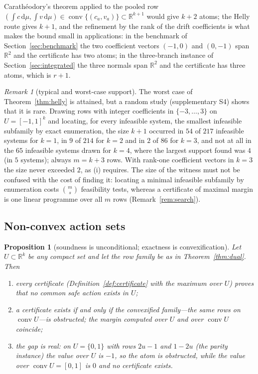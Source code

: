 \documentclass[11pt,a4paper]{article}
\theoremstyle{plain}
\newtheorem{proposition}[theorem]{Proposition}
\theoremstyle{definition}
\theoremstyle{remark}
\newtheorem{remark}[theorem]{Remark}
\newcommand{\R}{\mathbb{R}}
\newcommand{\conv}{\operatorname{conv}}
\newcommand{\dd}{\,\mathrm{d}}
\begin{document}
Carath\'eodory's theorem applied to the pooled row $(\int c\dd\mu,\int v\dd\mu)\in\conv\{(c_a,v_a)\}\subset\R^{k+1}$ would give $k+2$ atoms; the Helly route gives $k+1$, and the refinement by the rank of the drift coefficients is what makes the bound small in applications: in the benchmark of Section~\ref{sec:benchmark} the two coefficient vectors $(-1,0)$ and $(0,-1)$ span $\R^2$ and the certificate has two atoms; in the three-branch instance of Section~\ref{sec:integrated} the three normals span $\R^2$ and the certificate has three atoms, which is $r+1$.

\begin{remark}[typical and worst-case support]\label{rem:random}
The worst case of Theorem~\ref{thm:helly} is attained, but a random study (supplementary S4) shows that it is rare. Drawing rows with integer coefficients in $\{-3,\dots,3\}$ on $U=[-1,1]^k$ and locating, for every infeasible system, the smallest infeasible subfamily by exact enumeration, the size $k+1$ occurred in $54$ of $217$ infeasible systems for $k=1$, in $9$ of $214$ for $k=2$ and in $2$ of $86$ for $k=3$, and not at all in the $65$ infeasible systems drawn for $k=4$, where the largest support found was $4$ (in $5$ systems); always $m=k+3$ rows. With rank-one coefficient vectors in $k=3$ the size never exceeded $2$, as (i) requires. The size of the witness must not be confused with the cost of finding it: locating a minimal infeasible subfamily by enumeration costs $\binom{m}{s}$ feasibility tests, whereas a certificate of maximal margin is one linear programme over all $m$ rows (Remark~\ref{rem:search}).
\end{remark}

\subsection{Non-convex action sets}

\begin{proposition}[soundness is unconditional; exactness is convexification]\label{prop:nonconvex}
Let $U\subset\R^k$ be any compact set and let the row family be as in Theorem~\ref{thm:dual}. Then
\begin{enumerate}[leftmargin=1.6em,itemsep=1pt]
\item[(i)] every certificate (Definition~\ref{def:certificate} with the maximum over $U$) proves that no common safe action exists in $U$;
\item[(ii)] a certificate exists if and only if the convexified family---the same rows on $\conv U$---is obstructed; the margin computed over $U$ and over $\conv U$ coincide;
\item[(iii)] the gap is real: on $U=\{0,1\}$ with rows $2u-1$ and $1-2u$ (the \emph{parity instance}) the value over $U$ is $-1$, so the atom is obstructed, while the value over $\conv U=[0,1]$ is $0$ and no certificate exists.
\end{enumerate}
\end{proposition}
\end{document}
